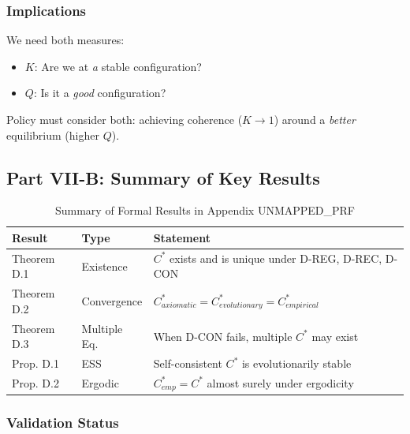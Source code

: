 \subsubsection{Implications}

We need both measures:
\begin{itemize}[nosep]
    \item $K$: Are we at \emph{a} stable configuration?
    \item $Q$: Is it a \emph{good} configuration?
\end{itemize}

Policy must consider both: achieving coherence ($K \to 1$) around a
\emph{better} equilibrium (higher $Q$).



\subsection{Part VII-B: Summary of Key Results}
\label{sec:D-results}

\begin{table}[htbp]
\centering
\caption{Summary of Formal Results in Appendix UNMAPPED_PRF}
\label{tab:D-results}
\renewcommand{\arraystretch}{1.2}
\begin{tabular}{@{}llp{6cm}@{}}
\toprule
\textbf{Result} & \textbf{Type} & \textbf{Statement} \\
\midrule
Theorem D.1 & Existence & $C^*$ exists and is unique under D-REG, D-REC, D-CON \\
Theorem D.2 & Convergence & $C^*_{axiomatic} = C^*_{evolutionary} = C^*_{empirical}$ \\
Theorem D.3 & Multiple Eq. & When D-CON fails, multiple $C^*$ may exist \\
Prop. D.1 & ESS & Self-consistent $C^*$ is evolutionarily stable \\
Prop. D.2 & Ergodic & $C^*_{emp} = C^*$ almost surely under ergodicity \\
\bottomrule
\end{tabular}
\end{table}

\subsubsection{Validation Status}

